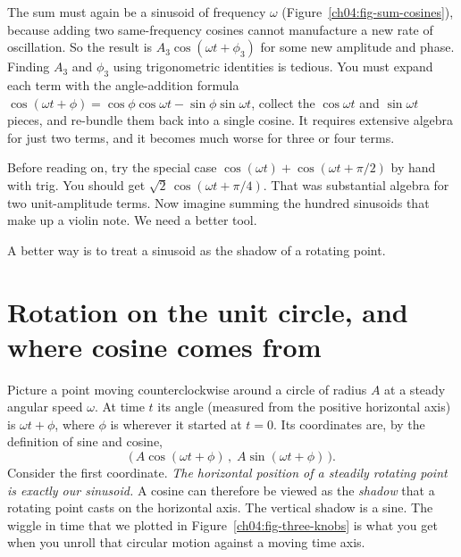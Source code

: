 The sum must again be a sinusoid of frequency $\omega$ (Figure~\ref{ch04:fig-sum-cosines}), because adding two same-frequency cosines cannot manufacture a new rate of oscillation. So the result is
$A_3\cos(\omega t + \phi_3)$ for some new amplitude and phase. Finding $A_3$ and $\phi_3$ using trigonometric identities is tedious. You must expand each term with the angle-addition formula $\cos(\omega t + \phi) = \cos\phi\cos\omega t - \sin\phi\sin\omega t$, collect the $\cos\omega t$ and $\sin\omega t$ pieces, and re-bundle them back into a single cosine. It requires extensive algebra for just two terms, and it becomes much worse for three or four terms.

\begin{walkbox}
Before reading on, try the special case $\cos(\omega t) + \cos(\omega t + \pi/2)$ by hand with
trig. You should get $\sqrt{2}\,\cos(\omega t + \pi/4)$. That was substantial algebra for two
unit-amplitude terms. Now imagine summing the hundred sinusoids that make up a violin note. We
need a better tool.
\end{walkbox}

A better way is to treat a sinusoid as the shadow of a rotating point.

\section{Rotation on the unit circle, and where cosine comes from}
\label{ch04:rotation}

Picture a point moving counterclockwise around a circle of radius $A$ at a steady angular speed
$\omega$. At time $t$ its angle (measured from the positive horizontal axis) is $\omega t + \phi$,
where $\phi$ is wherever it started at $t = 0$. Its coordinates are, by the definition of sine and
cosine,
\[
  \big(\,A\cos(\omega t + \phi)\,,\; A\sin(\omega t + \phi)\,\big).
\]
Consider the first coordinate. \emph{The horizontal position of a steadily rotating point is
exactly our sinusoid.} A cosine can therefore be viewed as the
\emph{shadow} that a rotating point casts on the horizontal axis. The vertical shadow is a sine.
The wiggle in time that we plotted in Figure~\ref{ch04:fig-three-knobs} is what you get when you
unroll that circular motion against a moving time axis.

